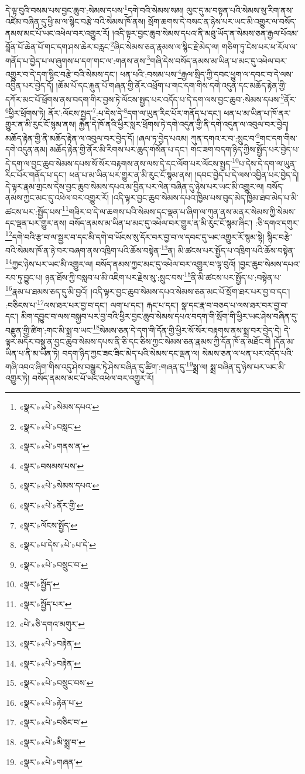 དེ་ལྟ་བུའི་བསམ་པས་བྱང་ཆུབ་:སེམས་དཔས་\footnote{«སྣར་»«པེ་»སེམས་དཔའ་}དགེ་བའི་སེམས་སམ། ལུང་དུ་མ་བསྟན་པའི་སེམས་སུ་རིག་ནས་འཛེམ་བཞིན་དུ་ཕྱི་མ་ལ་སྙིང་བརྩེ་བའི་སེམས་ཁོ་ནས། སྲོག་ཆགས་དེ་བསང་ན་ཉེས་པར་ཡང་མི་འགྱུར་ལ་བསོད་ནམས་མང་པོ་ཡང་འཕེལ་བར་འགྱུར་རོ། །འདི་ལྟར་བྱང་ཆུབ་སེམས་དཔའ་ནི་མཐུ་ཡོད་ན་སེམས་ཅན་རྒྱལ་པོའམ་བློན་པོ་ཆེན་པོ་གང་དག་ཤས་ཆེར་བརླང་\footnote{«སྣར་»«པེ་»བསླང་}ཞིང་སེམས་ཅན་རྣམས་ལ་སྙིང་རྗེ་མེད་ལ། གཅིག་ཏུ་ངེས་པར་ཕ་རོལ་ལ་གནོད་པ་བྱེད་པ་ལ་ཞུགས་པ་དག་གང་ལ་:གནས་ནས་\footnote{«སྣར་»«པེ་»གནས་ན་}གཞི་དེས་བསོད་ནམས་མ་ཡིན་པ་མང་དུ་འཕེལ་བར་འགྱུར་བ་དེ་དག་སྙིང་བརྩེ་བའི་སེམས་དང་། ཕན་པའི་:བསམ་པས་\footnote{«སྣར་»བསམས་པས་}རྒྱལ་སྲིད་ཀྱི་དབང་ཕྱུག་ལ་དབང་བ་དེ་ལས་འབྱིན་པར་བྱེད་དོ། །ཆོམ་པོ་དང་རྐུན་པོ་གཞན་གྱི་ནོར་འཕྲོག་པ་གང་དག་གིས་དགེ་འདུན་དང་མཆོད་རྟེན་གྱི་དཀོར་མང་པོ་ཕྲོགས་ནས་བདག་གིར་བྱས་ཏེ་ལོངས་སྤྱད་པར་འདོད་པ་དེ་དག་ལས་བྱང་ཆུབ་:སེམས་དཔས་\footnote{«སྣར་»«པེ་»སེམས་དཔའ་}ནོར་\footnote{«སྣར་»«པེ་»ནོར་གྱི་}ཕྱིར་ཕྲོགས་ཏེ། ནོར་:ལོངས་སྤྱད་\footnote{«སྣར་»ལོངས་སྤྱོད་}:པ་དེས་དེ་\footnote{«སྣར་»པ་དེས་«པེ་»པ་དེ་}དག་ལ་ཡུན་རིང་པོར་གནོད་པ་དང་། ཕན་པ་མ་ཡིན་པ་ཁོ་ནར་གྱུར་ན་མི་རུང་ངོ་སྙམ་ནས། རྐྱེན་དེ་ཁོ་ནའི་ཕྱིར་སླར་ཕྲོགས་ཏེ་དགེ་འདུན་གྱི་ནི་དགེ་འདུན་ལ་འབུལ་བར་བྱེད། མཆོད་རྟེན་གྱི་ནི་མཆོད་རྟེན་ལ་འབུལ་བར་བྱེད་དོ། །ཞལ་ཏ་བྱེད་པའམ། ཀུན་དགའ་ར་བ་:སྲུང་བ་\footnote{«སྣར་»«པེ་»བསྲུང་བ་}གང་དག་གིས་དགེ་འདུན་ནམ། མཆོད་རྟེན་གྱི་ནོར་མི་རིགས་པར་ཆུད་གསོན་པ་དང་། གང་ཟག་བདག་ཉིད་ཀྱིས་སྤྱོད་པར་བྱེད་པ་དེ་དག་ལ་བྱང་ཆུབ་སེམས་དཔས་སོ་སོར་བརྟགས་ནས་ལས་དེ་དང་ལོག་པར་ལོངས་སྤྱད་\footnote{«སྣར་»སྤྱོད་}པ་དེས་དེ་དག་ལ་ཡུན་རིང་པོར་གནོད་པ་དང་། ཕན་པ་མ་ཡིན་པར་གྱུར་ན་མི་རུང་ངོ་སྙམ་ནས། །དབང་བྱེད་པ་དེ་ལས་འབྱིན་པར་བྱེད་དེ། དེ་ལྟར་རྣམ་གྲངས་དེས་བྱང་ཆུབ་སེམས་དཔའ་མ་བྱིན་པར་ལེན་བཞིན་དུ་ཉེས་པར་ཡང་མི་འགྱུར་ལ། བསོད་ནམས་ཀྱང་མང་དུ་འཕེལ་བར་འགྱུར་རོ། །འདི་ལྟར་བྱང་ཆུབ་སེམས་དཔའ་ཁྱིམ་པས་བུད་མེད་ཁྱིམ་ཐབ་མེད་པ་མི་ཚངས་པར་:སྤྱོད་པས་\footnote{«སྣར་»སྤྱོད་པར་}གཟིར་བ་དེ་ལ་ཆགས་པའི་སེམས་དང་ལྡན་པ་ཞིག་ལ་ཀུན་ནས་མནར་སེམས་ཀྱི་སེམས་དང་ལྡན་པར་གྱུར་ནས། བསོད་ནམས་མ་ཡིན་པ་མང་དུ་འཕེལ་བར་གྱུར་ན་མི་རུང་ངོ་སྙམ་ཞིང་། :ཅི་དགའ་དགུར་\footnote{«པེ་»ཅི་དགའ་མགུར་}དགེ་བའི་རྩ་བ་ལ་སྦྱར་བ་དང་མི་དགེ་བ་ཡོངས་སུ་དོར་བར་བྱ་བ་ལ་དབང་དུ་ཡང་འགྱུར་རོ་སྙམ་སྟེ། སྙིང་བརྩེ་བའི་སེམས་ཁོ་ན་ཉེ་བར་བཞག་ནས་འཁྲིག་པའི་ཆོས་བསྟེན་\footnote{«སྣར་»«པེ་»བརྟེན་}ན། མི་ཚངས་པར་སྤྱོད་པ་འཁྲིག་པའི་ཆོས་བསྟེན་\footnote{«སྣར་»«པེ་»བརྟེན་}ཀྱང་ཉེས་པར་ཡང་མི་འགྱུར་ལ། བསོད་ནམས་ཀྱང་མང་དུ་འཕེལ་བར་འགྱུར་བ་ལྟ་བུའོ། །བྱང་ཆུབ་སེམས་དཔའ་རབ་ཏུ་བྱུང་པ། ཉན་ཐོས་ཀྱི་བསླབ་པ་མི་འཇིག་པར་རྗེས་སུ་:སྲུང་བས་\footnote{«སྣར་»«པེ་»བསྲུང་བས་}ནི་མི་ཚངས་པར་སྤྱོད་པ་:བསྟེན་པ་\footnote{«སྣར་»«པེ་»རྟེན་པ་}རྣམ་པ་ཐམས་ཅད་དུ་མི་བྱའོ། །འདི་ལྟར་བྱང་ཆུབ་སེམས་དཔའ་སེམས་ཅན་མང་པོ་སྲོག་ཐར་པར་བྱ་བ་དང་། :བཅིངས་པ་\footnote{«སྣར་»«པེ་»བཅིང་བ་}ལས་ཐར་པར་བྱ་བ་དང་། ལག་པ་དང་། རྐང་པ་དང་། སྣ་དང་རྣ་བ་བཅད་པ་ལས་ཐར་བར་བྱ་བ་དང་། མིག་དབྱུང་བ་ལས་བསྐྱབ་པར་བྱ་བའི་ཕྱིར་བྱང་ཆུབ་སེམས་དཔའ་བདག་གི་སྲོག་གི་ཕྱིར་ཡང་ཤེས་བཞིན་དུ་བརྫུན་གྱི་ཚིག་:གང་མི་སྨྲ་བ་ཡང་\footnote{«སྣར་»«པེ་»མི་སྨྲ་བ་}སེམས་ཅན་དེ་དག་གི་དོན་གྱི་ཕྱིར་སོ་སོར་བརྟགས་ནས་སྨྲ་བར་བྱེད་དེ། དེ་ལྟར་མདོར་བསྡུ་ན་བྱང་ཆུབ་སེམས་དཔས་ནི་ཅི་དང་ཅིས་ཀྱང་སེམས་ཅན་རྣམས་ཀྱི་དོན་ཁོ་ན་མཐོང་གི །དོན་མ་ཡིན་པ་ནི་མ་ཡིན་ཏེ། བདག་ཉིད་ཀྱང་ཟང་ཟིང་མེད་པའི་སེམས་དང་ལྡན་ལ། སེམས་ཅན་ལ་ཕན་པར་འདོད་པའི་གཞི་འབའ་ཞིག་གིས་འདུ་ཤེས་བསྒྱུར་ཏེ་ཤེས་བཞིན་དུ་ཚིག་:གཞན་དུ་\footnote{«སྣར་»«པེ་»གཞན་}སྨྲ་ལ། སྨྲ་བཞིན་དུ་ཉེས་པར་ཡང་མི་འགྱུར་ཏེ། བསོད་ནམས་མང་པོ་ཡང་འཕེལ་བར་འགྱུར་རོ། 
